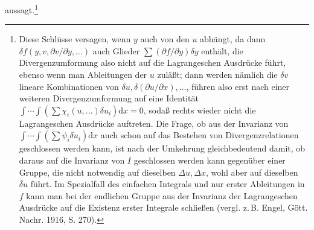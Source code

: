\documentclass[11pt]{article}
\newcommand{\D}{\Delta}
\providecommand{\dd}{\mathrm d}
\providecommand{\bd}{\bar{\delta}}
\providecommand{\p}{\partial}
\providecommand{\p}{\partial}
\providecommand{\dd}{\mathrm d}
\begin{document}
aussagt.\footnote{Diese Schlüsse versagen, wenn \(y\) auch von den \(u\) abhängt, da dann \(\delta f(y,v,\p v/\p y,\ldots)\) auch Glieder \(\sum(\p f/\p y)\delta y\) enthält, die Divergenzumformung also nicht auf die Lagrangeschen Ausdrücke führt, ebenso wenn man Ableitungen der \(u\) zuläßt; dann werden nämlich die \(\delta v\) lineare Kombinationen von \(\delta u,\delta(\p u/\p x),\ldots\), führen also erst nach einer weiteren Divergenzumformung auf eine Identität \(\int\!\cdots\!\int(\sum\chi_i(u,\ldots)\delta u_i)\dd x=0\), sodaß rechts wieder nicht die Lagrangeschen Ausdrücke auftreten. Die Frage, ob aus der Invarianz von \(\int\!\cdots\!\int(\sum\psi_i\delta u_i)\dd x\) auch schon auf das Bestehen von Divergenzrelationen geschlossen werden kann, ist nach der Umkehrung gleichbedeutend damit, ob daraus auf die Invarianz von \(I\) geschlossen werden kann gegenüber einer Gruppe, die nicht notwendig auf dieselben \(\D u,\D x\), wohl aber auf dieselben \(\bd u\) führt. Im Spezialfall des einfachen Integrals und nur erster Ableitungen in \(f\) kann man bei der endlichen Gruppe aus der Invarianz der Lagrangeschen Ausdrücke auf die Existenz erster Integrale schließen (vergl. z.\,B. Engel, Gött. Nachr. 1916, S. 270).}
\end{document}
